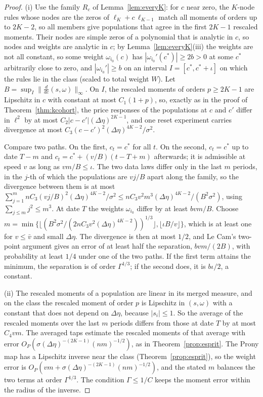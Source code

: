 \documentclass[12pt]{article}
\theoremstyle{definition}
\theoremstyle{remark}
\begin{document}
\begin{proof}
(i) Use the family $R_c$ of Lemma~\ref{lem:everyK}: for $c$ near zero, the $K$-node rules whose nodes are the zeros of $\ell_K+c\,\ell_{K-1}$ match all moments of orders up to $2K-2$, so all members give populations that agree in the first $2K-1$ rescaled moments. Their nodes are simple zeros of a polynomial that is analytic in $c$, so nodes and weights are analytic in $c$; by Lemma~\ref{lem:everyK}(iii) the weights are not all constant, so some weight $\omega_{i_0}(c)$ has $|\omega_{i_0}'(c^*)|\ge2b>0$ at some $c^*$ arbitrarily close to zero, and $|\omega_{i_0}'|\ge b$ on an interval $I=[c^*,c^*+\iota]$ on which the rules lie in the class (scaled to total weight $W$). Let $B=\sup_I\|\tfrac{d}{dc}(s,\omega)\|_\infty$. On $I$, the rescaled moments of orders $p\ge2K-1$ are Lipschitz in $c$ with constant at most $C_1(1+p)$, so, exactly as in the proof of Theorem~\ref{thm:kcohort}, the price responses of the populations at $c$ and $c'$ differ in $\ell^2$ by at most $C_2|c-c'|(\Delta\eta)^{2K-1}$, and one reset experiment carries divergence at most $C_3(c-c')^2(\Delta\eta)^{4K-2}/\sigma^2$.

Compare two paths. On the first, $c_t=c^*$ for all $t$. On the second, $c_t=c^*$ up to date $T-m$ and $c_t=c^*+(v/B)(t-T+m)$ afterwards; it is admissible at speed $v$ as long as $vm/B\le\iota$. The two data laws differ only in the last $m$ periods, in the $j$-th of which the populations are $vj/B$ apart along the family, so the divergence between them is at most $\sum_{j=1}^mnC_3(vj/B)^2(\Delta\eta)^{4K-2}/\sigma^2\le nC_3v^2m^3(\Delta\eta)^{4K-2}/(B^2\sigma^2)$, using $\sum_{j\le m}j^2\le m^3$. At date $T$ the weights $\omega_{i_0}$ differ by at least $bvm/B$. Choose $m=\min\{\lfloor(B^2\sigma^2/(2nC_3v^2(\Delta\eta)^{4K-2}))^{1/3}\rfloor,\lfloor\iota B/v\rfloor\}$, which is at least one for $v\le\bar v$ and small $\Delta\eta$. The divergence is then at most $1/2$, and Le Cam's two-point argument gives an error of at least half the separation, $bvm/(2B)$, with probability at least $1/4$ under one of the two paths. If the first term attains the minimum, the separation is of order $\Gamma^{1/3}$; if the second does, it is $b\iota/2$, a constant.

(ii) The rescaled moments of a population are linear in its merged measure, and on the class the rescaled moment of order $p$ is Lipschitz in $(s,\omega)$ with a constant that does not depend on $\Delta\eta$, because $|s_i|\le1$. So the average of the rescaled moments over the last $m$ periods differs from those at date $T$ by at most $C_4vm$. The averaged taps estimate the rescaled moments of that average with error $O_P(\sigma(\Delta\eta)^{-(2K-1)}(nm)^{-1/2})$, as in Theorem~\ref{prop:esprit}. The Prony map has a Lipschitz inverse near the class (Theorem~\ref{prop:esprit}), so the weight error is $O_P(vm+\sigma(\Delta\eta)^{-(2K-1)}(nm)^{-1/2})$, and the stated $m$ balances the two terms at order $\Gamma^{1/3}$. The condition $\Gamma\le1/C$ keeps the moment error within the radius of the inverse.


\end{proof}
\end{document}
